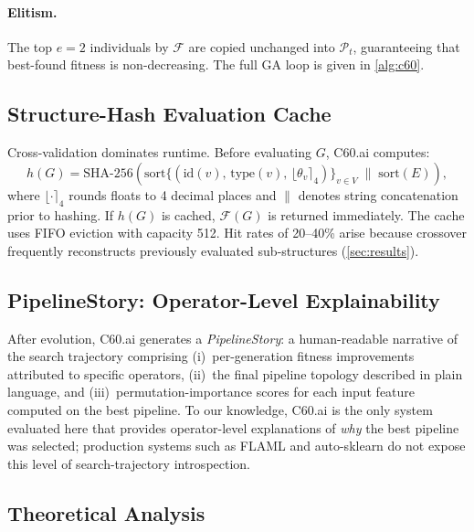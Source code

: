 \documentclass{article}
\theoremstyle{definition}
\theoremstyle{plain}
\theoremstyle{remark}
\begin{document}
\paragraph{Elitism.}
The top $e = 2$ individuals by $\mathcal{F}$ are copied unchanged into
$\mathcal{P}_t$, guaranteeing that best-found fitness is non-decreasing.
The full GA loop is given in \cref{alg:c60}.

\subsection{Structure-Hash Evaluation Cache}
\label{sec:cache}

Cross-validation dominates runtime.
Before evaluating $G$, C60.ai computes:
\begin{equation}
  h(G) = \mathrm{SHA\text{-}256}\!\left(
    \mathrm{sort}\bigl\{(\mathrm{id}(v),\,\mathrm{type}(v),\,
    \lfloor\theta_v \rceil_4)\bigr\}_{v \in V}
    \;\|\; \mathrm{sort}(E)
  \right),
  \label{eq:hash}
\end{equation}
where $\lfloor\cdot\rceil_4$ rounds floats to 4 decimal places and $\|$
denotes string concatenation prior to hashing.
If $h(G)$ is cached, $\mathcal{F}(G)$ is returned immediately.
The cache uses FIFO eviction with capacity 512.
Hit rates of 20--40\% arise because crossover frequently reconstructs
previously evaluated sub-structures (\cref{sec:results}).

\subsection{PipelineStory: Operator-Level Explainability}

After evolution, C60.ai generates a \emph{PipelineStory}: a human-readable
narrative of the search trajectory comprising (i)~per-generation fitness
improvements attributed to specific operators, (ii)~the final pipeline
topology described in plain language, and (iii)~permutation-importance scores
for each input feature computed on the best pipeline.
To our knowledge, C60.ai is the only system evaluated here that provides
operator-level explanations of \emph{why} the best pipeline was selected;
production systems such as FLAML and auto-sklearn do not expose this
level of search-trajectory introspection.

\subsection{Theoretical Analysis}
\label{sec:theory}
\end{document}
